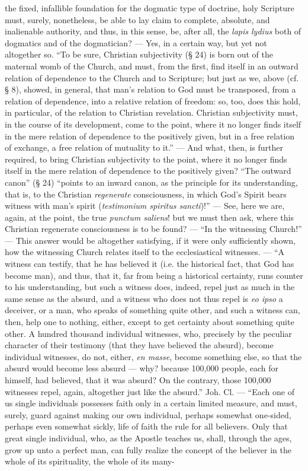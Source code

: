 \documentclass[12pt]{book}
\begin{document}
the fixed, infallible foundation for the dogmatic type of doctrine, holy Scripture must, surely, nonetheless, be able to lay claim to complete, absolute, and inalienable authority, and thus, in this sense, be, after all, the \textit{lapis lydius} both of dogmatics and of the dogmatician? --- Yes, in a certain way, but yet not altogether so. ``To be sure, Christian subjectivity (§ 24) is born out of the maternal womb of the Church, and must, from the first, find itself in an outward relation of dependence to the Church and to Scripture; but just as we, above (cf. § 8), showed, in general, that man's relation to God must be transposed, from a relation of dependence, into a relative relation of freedom: so, too, does this hold, in particular, of the relation to Christian revelation. Christian subjectivity must, in the course of its development, come to the point, where it no longer finds itself in the mere relation of dependence to the positively given, but in a free relation of exchange, a free relation of mutuality to it.'' --- And what, then, is further required, to bring Christian subjectivity to the point, where it no longer finds itself in the mere relation of dependence to the positively given? ``The outward canon'' (§ 24) ``points to an inward canon, as the principle for its understanding, that is, to the Christian \emph{regenerate} consciousness, in which God's Spirit bears witness with man's spirit (\textit{testimonium spiritus sancti})!'' --- See, here we are, again, at the point, the true \textit{punctum saliens}! but we must then ask, where this Christian regenerate consciousness
is to be found? --- ``In the witnessing Church!'' --- This answer would be altogether satisfying, if it were only sufficiently shown, how the witnessing Church relates itself to the ecclesiastical witnesses. --- ``A witness can testify, that he has believed it (i.e. the historical fact, that God has become man), and thus, that it, far from being a historical certainty, runs counter to his understanding, but such a witness does, indeed, repel just as much in the same sense as the absurd, and a witness who does not thus repel is \textit{eo ipso} a deceiver, or a man, who speaks of something quite other, and such a witness can, then, help one to nothing, either, except to get certainty about something quite other. A hundred thousand individual witnesses, who, precisely by the peculiar character of their testimony (that they have believed the absurd), become individual witnesses, do not, either, \textit{en masse}, become something else, so that the absurd would become less absurd --- why? because 100,000 people, each for himself, had believed, that it was absurd? On the contrary, those 100,000 witnesses repel, again, altogether just like the absurd.'' Joh. Cl. --- ``Each one of us single individuals possesses faith only in a certain limited measure, and must, surely, guard against making our own individual, perhaps somewhat one-sided, perhaps even somewhat sickly, life of faith the rule for all believers. Only that great single individual, who, as the Apostle teaches us, shall, through the ages, grow up unto a perfect man, can fully realize the concept of the believer in the whole of its spirituality, the whole of its many-%
\end{document}

